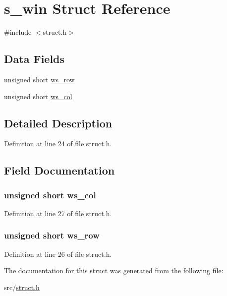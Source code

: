 \hypertarget{structs__win}{\section{s\+\_\+win Struct Reference}
\label{structs__win}
}


{\ttfamily \#include $<$struct.\+h$>$}

\subsection*{Data Fields}
\begin{DoxyCompactItemize}
\item 
unsigned short \hyperlink{structs__win_a8455c8307c8ae968856991b5c2edcba0}{ws\+\_\+row}
\item 
unsigned short \hyperlink{structs__win_a4e557557036184000ce686d1803f0eb6}{ws\+\_\+col}
\end{DoxyCompactItemize}


\subsection{Detailed Description}


Definition at line 24 of file struct.\+h.



\subsection{Field Documentation}
\hypertarget{structs__win_a4e557557036184000ce686d1803f0eb6}{
\subsubsection[{ws\+\_\+col}]{\setlength{\rightskip}{0pt plus 5cm}unsigned short ws\+\_\+col}}\label{structs__win_a4e557557036184000ce686d1803f0eb6}


Definition at line 27 of file struct.\+h.

\hypertarget{structs__win_a8455c8307c8ae968856991b5c2edcba0}{
\subsubsection[{ws\+\_\+row}]{\setlength{\rightskip}{0pt plus 5cm}unsigned short ws\+\_\+row}}\label{structs__win_a8455c8307c8ae968856991b5c2edcba0}


Definition at line 26 of file struct.\+h.



The documentation for this struct was generated from the following file\+:\begin{DoxyCompactItemize}
\item 
src/\hyperlink{struct_8h}{struct.\+h}\end{DoxyCompactItemize}
